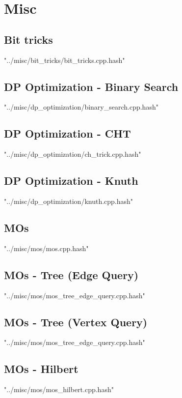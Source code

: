 \documentclass [12pt,onecolumn,oneside]{article}
\begin{document}
\section{Misc}
\subsection{ Bit tricks}
 {"../misc/bit_tricks/bit_tricks.cpp.hash"}
\newpage

\subsection{ DP Optimization - Binary Search}
 {"../misc/dp_optimization/binary_search.cpp.hash"}
\newpage

\subsection{ DP Optimization - CHT}
 {"../misc/dp_optimization/ch_trick.cpp.hash"}
\newpage

\subsection{ DP Optimization - Knuth}
 {"../misc/dp_optimization/knuth.cpp.hash"}
\newpage

\subsection{ MOs}
 {"../misc/mos/mos.cpp.hash"}
\newpage

\subsection{ MOs - Tree (Edge Query)}
 {"../misc/mos/mos_tree_edge_query.cpp.hash"}
\newpage

\subsection{ MOs - Tree (Vertex Query)}
 {"../misc/mos/mos_tree_edge_query.cpp.hash"}
\newpage

\subsection{ MOs - Hilbert}
 {"../misc/mos/mos_hilbert.cpp.hash"}
\newpage
\end{document}
